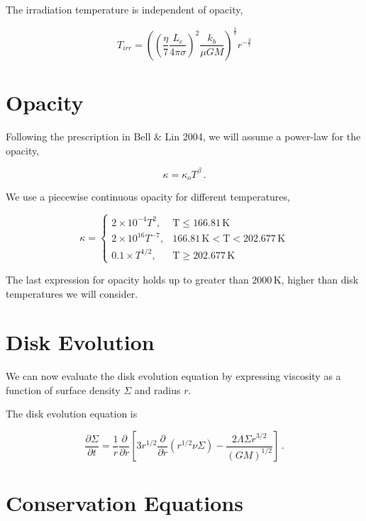 \documentclass{article}
\begin{document}
The irradiation temperature is independent of opacity,
 
\begin{equation}
T_{irr} = \left( \left(\frac{\eta}{7} \frac{L_c}{4 \pi \sigma}\right)^2 \frac{k_b}{\mu G M}\right)^\frac{1}{7} r^{-\frac{3}{7}}
\end{equation}

\section{Opacity}

Following the prescription in Bell \& Lin 2004, we will assume a power-law for the opacity,

\begin{equation}
\kappa = \kappa_o T^\beta\,.
\end{equation} 

We use a piecewise continuous opacity  for different temperatures,

$$\kappa =
\begin{cases}
2\times 10^{-4} T^2, & \textrm{T} \leq 166.81\, \textrm{K} \\
2\times 10^{16} T^{-7}, & 166.81\, \textrm{K} <  \textrm{T} < 202.677\, \textrm{K} \\
0.1\times T^{1/2}, & \textrm{T} \geq 202.677\, \textrm{K}
\end{cases}
$$

The last expression for opacity holds up to greater than $2000$\,K, higher than disk temperatures we will consider.

\section{Disk Evolution}

We can now evaluate the disk evolution equation by expressing viscosity as a function of surface density $\Sigma$ and radius $r$.

The disk evolution equation is

\begin{equation} \label{eq:diskev}
\frac{\partial \Sigma}{\partial t} = \frac{1}{r} \frac{\partial}{\partial r} \left[3 r^{1/2} \frac{\partial}{\partial r} \left(r^{1/2} \nu \Sigma\right) - \frac{2 \Lambda \Sigma r^{3/2}}{(G M)^{1/2}}\right]\,.
\end{equation}

\section{Conservation Equations}
\end{document}
